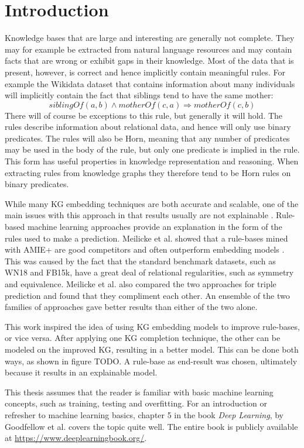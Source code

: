 \chapter{Introduction}

Knowledge bases that are large and interesting are generally not complete. They may for example be extracted from natural language resources and may contain facts that are wrong or exhibit gaps in their knowledge. Most of the data that is present, however, is correct and hence implicitly contain meaningful rules. For example the Wikidata dataset that contains information about many individuals will implicitly contain the fact that siblings tend to have the same mother:
\[siblingOf(a, b) \wedge motherOf(c, a) \Rightarrow motherOf(c, b)\]
There will of course be exceptions to this rule, but generally it will hold. The rules describe information about relational data, and hence will only use binary predicates. The rules will also be Horn, meaning that any number of predicates may be used in the body of the rule, but only one predicate is implied in the rule. This form has useful properties in knowledge representation and reasoning. When extracting rules from knowledge graphs they therefore tend to be Horn rules on binary predicates.

While many KG embedding techniques are both accurate and scalable, one of the main issues with this approach in that results usually are not explainable \cite{bonatti2019knowledge}. Rule-based machine learning approaches provide an explanation in the form of the rules used to make a prediction.  Meilicke et al. showed that a rule-bases mined with AMIE+ are good competitors and often outperform embedding models \cite{ensemble}. This was caused by the fact that the standard benchmark datasets, such as WN18 and FB15k,  have a great deal of relational regularities, such as symmetry and equivalence. Meilicke et al. also compared the two approaches for triple prediction and found that they compliment each other. An ensemble of the two families of approaches gave better results than either of the two alone.

This work inspired the idea of using KG embedding models to improve rule-bases, or vice versa. After applying one KG completion technique, the other can be modeled on the improved KG, resulting in a better model. This can be done both ways, as shown in figure TODO. A rule-base as end-result was chosen, ultimately because it results in an explainable model. 


This thesis assumes that the reader is familiar with basic machine learning concepts, such as training, testing and overfitting. For an introduction or refresher to machine learning basics, chapter 5 in the book \textit{Deep Learning}, by Goodfellow et al. \cite{goodfellow} covers the topic quite well. The entire book is publicly available at \href{https://www.deeplearningbook.org/}{https://www.deeplearningbook.org/}.